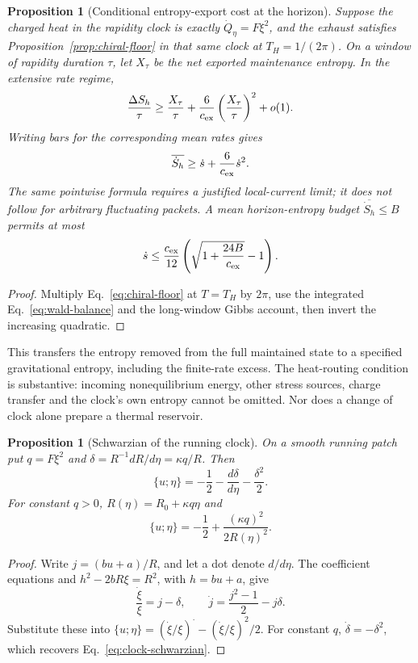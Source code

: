 \documentclass[12pt,a4paper]{article}
\newtheorem{proposition}[theorem]{Proposition}
\begin{document}
\begin{proposition}[Conditional entropy-export cost at the horizon]
\label{prop:horizon-floor}
Suppose the charged heat in the rapidity clock is exactly
$\dot Q_\eta=F\xi^2$, and the exhaust satisfies
Proposition~\ref{prop:chiral-floor} in that same clock at $T_H=1/(2\pi)$.
On a window of rapidity duration $\tau$, let $X_\tau$ be the net exported
maintenance entropy. In the extensive rate regime,
\[
 \frac{\Delta S_h}{\tau}\ge\frac{X_\tau}{\tau}
       +\frac{6}{c_{\rm ex}}\left(\frac{X_\tau}{\tau}\right)^2+o(1).
\]
Writing bars for the corresponding mean rates gives
\begin{equation}\label{eq:horizon-floor}
 \overline{\dot S_h}\ge \dot s+\frac{6}{c_{\rm ex}}\dot s^2.
\end{equation}
The same pointwise formula requires a justified local-current limit; it does
not follow for arbitrary fluctuating packets. A mean horizon-entropy budget
$\overline{\dot S_h}\le B$ permits at most
\[
 \dot s\le \frac{c_{\rm ex}}{12}
       \left(\sqrt{1+\frac{24B}{c_{\rm ex}}}-1\right).
\]
\end{proposition}
\begin{proof}
Multiply Eq.~\eqref{eq:chiral-floor} at $T=T_H$ by $2\pi$, use
the integrated Eq.~\eqref{eq:wald-balance} and the long-window Gibbs account,
then invert the increasing quadratic.
\end{proof}

This transfers the entropy removed from the full maintained state to a specified
gravitational entropy, including the finite-rate excess. The heat-routing
condition is substantive: incoming nonequilibrium energy, other stress sources,
charge transfer and the clock's own entropy cannot be omitted. Nor does a change
of clock alone prepare a thermal reservoir.

\begin{proposition}[Schwarzian of the running clock]
\label{prop:clock-schwarzian}
On a smooth running patch put $q=F\xi^2$ and
$\delta=R^{-1}dR/d\eta=\kappa q/R$. Then
\begin{equation}\label{eq:clock-general}
 \{u;\eta\}=-\frac12-\frac{d\delta}{d\eta}-\frac{\delta^2}{2}.
\end{equation}
For constant $q>0$, $R(\eta)=R_0+\kappa q\eta$ and
\begin{equation}\label{eq:clock-schwarzian}
 \{u;\eta\}=-\frac12+\frac{(\kappa q)^2}{2R(\eta)^2}.
\end{equation}
\end{proposition}
\begin{proof}
Write $j=(bu+a)/R$, and let a dot denote $d/d\eta$.
The coefficient equations and $h^2-2bR\xi=R^2$, with $h=bu+a$, give
\[
 \frac{\dot\xi}{\xi}=j-\delta,\qquad
 \dot j=\frac{j^2-1}{2}-j\delta.
\]
Substitute these into $\{u;\eta\}=(\dot\xi/\xi)^{\displaystyle\cdot}
-(\dot\xi/\xi)^2/2$. For constant $q$, $\dot\delta=-\delta^2$,
which recovers Eq.~\eqref{eq:clock-schwarzian}.
\end{proof}
\end{document}
